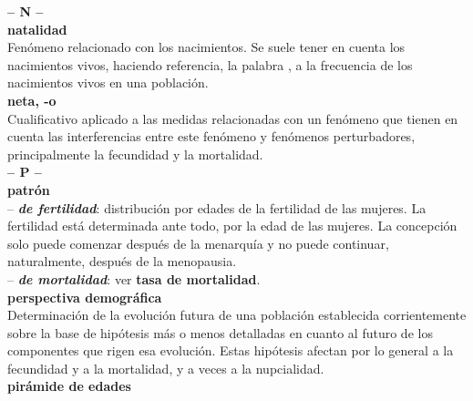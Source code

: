 \begin{multicols}{2}
\noindent\textbf{\huge{-- N --}}\\

\noindent \textbf{\Large{natalidad}}\\

\vspace{-0.3cm}
Fenómeno relacionado con los nacimientos. Se suele tener en cuenta los nacimientos vivos, haciendo referencia, la palabra , a la frecuencia de los nacimientos vivos en una población.\\

 \noindent \textbf{\Large{neta, -o}}\\
 
\vspace{-0.3cm}
Cualificativo aplicado a las medidas relacionadas con un fenómeno que tienen en cuenta las interferencias entre este fenómeno y fenómenos perturbadores, principalmente la fecundidad y la mortalidad.\\


\noindent\textbf{\huge{-- P --}}\\

\noindent \textbf{\Large{patrón}}\\

\vspace{-0.3cm}
-- \textbf{\textit{de fertilidad}}: distribución por edades de la fertilidad de las mujeres. La fertilidad está determinada ante todo, por la edad de las mujeres. La concepción solo puede comenzar después de la menarqu\'ia y no puede continuar, naturalmente, después de la menopausia.\\

\vspace{-0.3cm}
-- \textbf{\textit{de mortalidad}}: ver \textbf{tasa de mortalidad}.\\

\noindent \textbf{\Large{perspectiva demográfica}}\\

\vspace{-0.3cm}
Determinación de la evolución futura de una población establecida corrientemente sobre la base de hipótesis más o menos detalladas en cuanto al futuro de los componentes que rigen esa evolución. Estas hipótesis afectan por lo general a la fecundidad y a la mortalidad, y a veces a la nupcialidad.\\

\noindent \textbf{\Large{pir\'amide de edades}}\\


\end{multicols}
